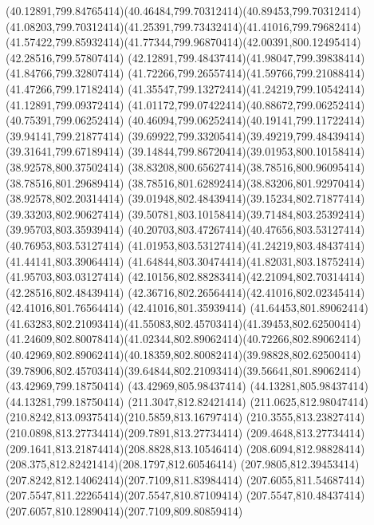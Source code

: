 {{	\curveto(40.12891,799.84765414)(40.46484,799.70312414)(40.89453,799.70312414)
	\curveto(41.08203,799.70312414)(41.25391,799.73432414)(41.41016,799.79682414)
	\curveto(41.57422,799.85932414)(41.77344,799.96870414)(42.00391,800.12495414)
	\lineto(42.28516,799.57807414)
	\curveto(42.12891,799.48437414)(41.98047,799.39838414)(41.84766,799.32807414)
	\curveto(41.72266,799.26557414)(41.59766,799.21088414)(41.47266,799.17182414)
	\curveto(41.35547,799.13272414)(41.24219,799.10542414)(41.12891,799.09372414)
	\curveto(41.01172,799.07422414)(40.88672,799.06252414)(40.75391,799.06252414)
	\curveto(40.46094,799.06252414)(40.19141,799.11722414)(39.94141,799.21877414)
	\curveto(39.69922,799.33205414)(39.49219,799.48439414)(39.31641,799.67189414)
	\curveto(39.14844,799.86720414)(39.01953,800.10158414)(38.92578,800.37502414)
	\curveto(38.83208,800.65627414)(38.78516,800.96095414)(38.78516,801.29689414)
	\curveto(38.78516,801.62892414)(38.83206,801.92970414)(38.92578,802.20314414)
	\curveto(39.01948,802.48439414)(39.15234,802.71877414)(39.33203,802.90627414)
	\curveto(39.50781,803.10158414)(39.71484,803.25392414)(39.95703,803.35939414)
	\curveto(40.20703,803.47267414)(40.47656,803.53127414)(40.76953,803.53127414)
	\curveto(41.01953,803.53127414)(41.24219,803.48437414)(41.44141,803.39064414)
	\curveto(41.64844,803.30474414)(41.82031,803.18752414)(41.95703,803.03127414)
	\curveto(42.10156,802.88283414)(42.21094,802.70314414)(42.28516,802.48439414)
	\curveto(42.36716,802.26564414)(42.41016,802.02345414)(42.41016,801.76564414)
	\lineto(42.41016,801.35939414)
	\closepath
	\moveto(41.64453,801.89062414)
	\curveto(41.63283,802.21093414)(41.55083,802.45703414)(41.39453,802.62500414)
	\curveto(41.24609,802.80078414)(41.02344,802.89062414)(40.72266,802.89062414)
	\curveto(40.42969,802.89062414)(40.18359,802.80082414)(39.98828,802.62500414)
	\curveto(39.78906,802.45703414)(39.64844,802.21093414)(39.56641,801.89062414)
	\closepath
	\moveto(43.42969,799.18750414)
	\lineto(43.42969,805.98437414)
	\lineto(44.13281,805.98437414)
	\lineto(44.13281,799.18750414)
	\closepath
	\moveto(211.3047,812.82421414)
	\curveto(211.0625,812.98047414)(210.8242,813.09375414)(210.5859,813.16797414)
	\curveto(210.3555,813.23827414)(210.0898,813.27734414)(209.7891,813.27734414)
	\curveto(209.4648,813.27734414)(209.1641,813.21874414)(208.8828,813.10546414)
	\curveto(208.6094,812.98828414)(208.375,812.82421414)(208.1797,812.60546414)
	\curveto(207.9805,812.39453414)(207.8242,812.14062414)(207.7109,811.83984414)
	\curveto(207.6055,811.54687414)(207.5547,811.22265414)(207.5547,810.87109414)
	\curveto(207.5547,810.48437414)(207.6057,810.12890414)(207.7109,809.80859414)
}}

